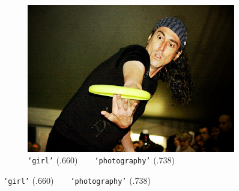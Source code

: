 {\begin{landscape}
\begin{figure}[th]
\begin{subfigure}{.3\linewidth}
    \end{subfigure}
    \hfill
    \begin{subfigure}{.3\linewidth}
        \centering
        \includegraphics[width=.8\linewidth]{evolution-man}
        \caption{\texttt{`girl'} (.660)~~\ra{}~~\texttt{`photography'} (.738)}
    \end{subfigure}
    
    \bigskip
    

\end{figure}
\end{landscape}}
